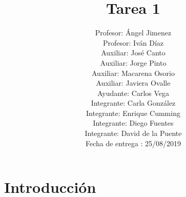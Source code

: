 \documentclass[preprintnumbers,superscriptaddress,amsmath,%
  amssymb,aps,reprint,nofootinbib]{revtex4-1}
\numberwithin{equation}{section}
\begin{document}
\title{\Large{Tarea 1}}
\author{Profesor: Ángel Jimenez \\ Profesor: Iván Díaz  \\ Auxiliar: José Canto \\ Auxiliar: Jorge Pinto \\Auxiliar: Macarena Osorio \\Auxiliar: Javiera Ovalle \\ Ayudante: Carlos Vega \\ Integrante: Carla González \\Integrante: Enrique Cumming \\ Integrante: Diego Fuentes\\ Integrante: David de la Puente \\ Fecha de entrega : 25/08/2019} 











\maketitle
\onecolumngrid

\section{Introducción}

\end{document}
